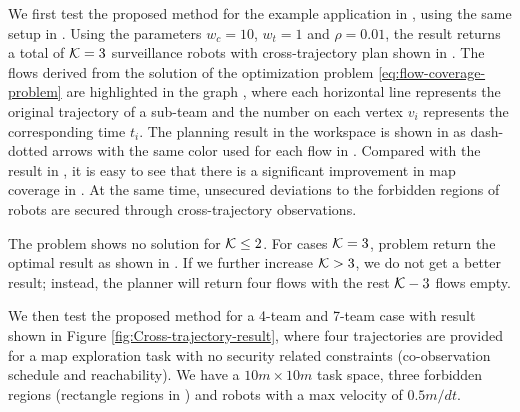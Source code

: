 \documentclass[10pt,twocolumn,twoside]{IEEEtran}
\begin{document}
We first test the proposed method for the example application in , using the same setup in . Using the parameters $w_{c}=10$, $w_{t}=1$ and $\rho = 0.01$, the result returns a total of $\mathcal{K}=3$ surveillance robots with cross-trajectory plan shown in . %
The flows derived from the solution of the optimization problem \eqref{eq:flow-coverage-problem} are highlighted in the graph , where each horizontal line represents the original trajectory of a sub-team and the number on each vertex $v_{i}$ represents the corresponding time $t_{i}$. The planning result in the workspace is shown in  as dash-dotted arrows with the same color used for each flow in . Compared with the result in , it is easy to see that there is a significant improvement in map coverage in . At the same time, unsecured deviations to the forbidden regions of robots are secured through cross-trajectory observations. 

The problem shows no solution for $\mathcal{K}\leq 2$. For cases $\mathcal{K}=3$, problem return the optimal result as shown in . If we further increase $\mathcal{K}>3$, we do not get a better result; instead, the planner will return four flows with the rest $\mathcal{K}-3$ flows empty. 

We then test the proposed method for a 4-team and 7-team case with result shown in Figure \ref{fig:Cross-trajectory-result}, where four trajectories are provided for a map exploration task with no security related constraints (co-observation schedule and reachability). We have a $10m\times10m$ task space, three forbidden regions (rectangle regions in ) and robots with a max velocity of $0.5m/dt$. 
\end{document}
